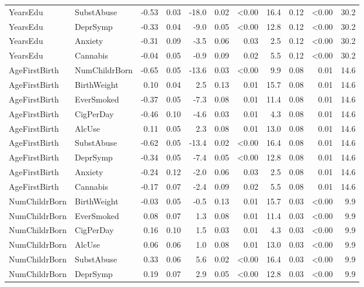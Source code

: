 {\begin{longtable}{llrrrrrrrrr}
YearsEdu & SubstAbuse & -0.53 & 0.03 & -18.0 & 0.02 & \textless 0.00 & 16.4 & 0.12 & \textless 0.00 & 30.2 \\ 
YearsEdu & DeprSymp & -0.33 & 0.04 & -9.0 & 0.05 & \textless 0.00 & 12.8 & 0.12 & \textless 0.00 & 30.2 \\ 
YearsEdu & Anxiety & -0.31 & 0.09 & -3.5 & 0.06 & 0.03 & 2.5 & 0.12 & \textless 0.00 & 30.2 \\ 
YearsEdu & Cannabis & -0.04 & 0.05 & -0.9 & 0.09 & 0.02 & 5.5 & 0.12 & \textless 0.00 & 30.2 \\ 
AgeFirstBirth & NumChildrBorn & -0.65 & 0.05 & -13.6 & 0.03 & \textless 0.00 & 9.9 & 0.08 & 0.01 & 14.6 \\ 
AgeFirstBirth & BirthWeight & 0.10 & 0.04 & 2.5 & 0.13 & 0.01 & 15.7 & 0.08 & 0.01 & 14.6 \\ 
AgeFirstBirth & EverSmoked & -0.37 & 0.05 & -7.3 & 0.08 & 0.01 & 11.4 & 0.08 & 0.01 & 14.6 \\ 
AgeFirstBirth & CigPerDay & -0.46 & 0.10 & -4.6 & 0.03 & 0.01 & 4.3 & 0.08 & 0.01 & 14.6 \\ 
AgeFirstBirth & AlcUse & 0.11 & 0.05 & 2.3 & 0.08 & 0.01 & 13.0 & 0.08 & 0.01 & 14.6 \\ 
AgeFirstBirth & SubstAbuse & -0.62 & 0.05 & -13.4 & 0.02 & \textless 0.00 & 16.4 & 0.08 & 0.01 & 14.6 \\ 
AgeFirstBirth & DeprSymp & -0.34 & 0.05 & -7.4 & 0.05 & \textless 0.00 & 12.8 & 0.08 & 0.01 & 14.6 \\ 
AgeFirstBirth & Anxiety & -0.24 & 0.12 & -2.0 & 0.06 & 0.03 & 2.5 & 0.08 & 0.01 & 14.6 \\ 
AgeFirstBirth & Cannabis & -0.17 & 0.07 & -2.4 & 0.09 & 0.02 & 5.5 & 0.08 & 0.01 & 14.6 \\ 
NumChildrBorn & BirthWeight & -0.03 & 0.05 & -0.5 & 0.13 & 0.01 & 15.7 & 0.03 & \textless 0.00 & 9.9 \\ 
NumChildrBorn & EverSmoked & 0.08 & 0.07 & 1.3 & 0.08 & 0.01 & 11.4 & 0.03 & \textless 0.00 & 9.9 \\ 
NumChildrBorn & CigPerDay & 0.16 & 0.10 & 1.5 & 0.03 & 0.01 & 4.3 & 0.03 & \textless 0.00 & 9.9 \\ 
NumChildrBorn & AlcUse & 0.06 & 0.06 & 1.0 & 0.08 & 0.01 & 13.0 & 0.03 & \textless 0.00 & 9.9 \\ 
NumChildrBorn & SubstAbuse & 0.33 & 0.06 & 5.6 & 0.02 & \textless 0.00 & 16.4 & 0.03 & \textless 0.00 & 9.9 \\ 
NumChildrBorn & DeprSymp & 0.19 & 0.07 & 2.9 & 0.05 & \textless 0.00 & 12.8 & 0.03 & \textless 0.00 & 9.9 \\ 

\end{longtable}}
